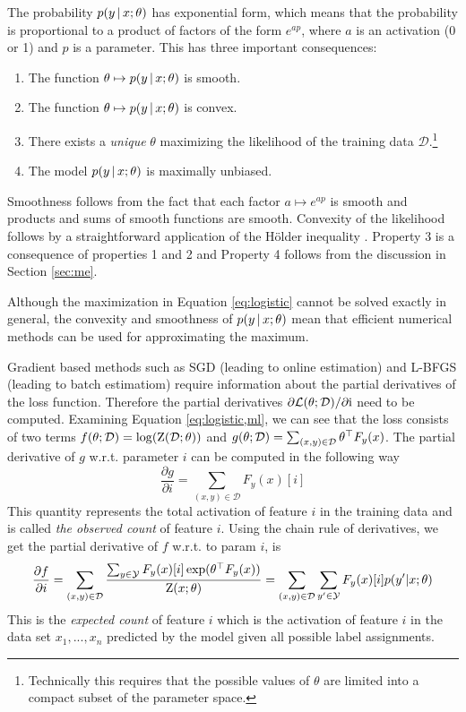 The probability $p(y\mbox{$ \, | \, $} x\mbox{$ ; \, $} \theta)$ has exponential form,
which means that the probability is proportional to a product of
factors of the form $e^{ap}$, where $a$ is an activation (0 or 1) and
$p$ is a parameter. This has three important consequences:

\begin{enumerate}
\item The function $\theta \mapsto p(y\mbox{$ \, | \, $} x\mbox{$ ; \, $} \theta)$ is smooth.
\item The function $\theta \mapsto p(y\mbox{$ \, | \, $} x\mbox{$ ; \, $} \theta)$ is convex.
\item There exists a {\it unique} $\theta$ maximizing the likelihood of the training data $\mathcal{D}$.\footnote{Technically this requires that the possible values of $\theta$ are limited into a compact subset of the parameter space.}
\item The model $p(y\mbox{$ \, | \, $} x\mbox{$ ; \, $} \theta)$ is maximally unbiased. 
\end{enumerate}

Smoothness follows from the fact that each factor $a \mapsto e^{ap}$
is smooth and products and sums of smooth functions are
smooth. Convexity of the likelihood follows by a straightforward application of the Hölder inequality \cite{}. Property 3 is a consequence of properties 1 and 2 and
Property 4 follows from the discussion in Section \ref{sec:me}.

Although the maximization in Equation \ref{eq:logistic} cannot be
solved exactly in general, the convexity and smoothness of
$p(y\mbox{$ \, | \, $} x\mbox{$ ; \, $} \theta)$ mean that efficient numerical methods can
be used for approximating the maximum.

Gradient based methods such as SGD (leading to online estimation) and
L-BFGS (leading to batch estimatiom) require information about the
partial derivatives of the loss function. Therefore the partial
derivatives $\partial\mathcal{L}(\theta\mbox{$ ; \, $}
\mathcal{D})/\partial\mbox{${\rm i}$}$ need to be computed. Examining Equation
\ref{eq:logistic,ml}, we can see that the loss consists of two terms
$f(\theta\mbox{$ ; \, $} \mathcal{D}) = \log(\mbox{${\rm Z}$}(\mathcal{D}\mbox{$ ; \, $} \theta))$
and $g(\theta\mbox{$ ; \, $}\mathcal{D}) = \sum_{(x,y) \in
  \mathcal{D}}\theta^\top F_y(x)$. The partial derivative of $g$
w.r.t. parameter $i$ can be computed in the following way
$$\frac{\partial g}{\partial i} = \sum_{(x,y) \in \mathcal{D}} F_y(x)[i]$$
This quantity represents the total activation of feature $i$ in the training data and is called {\it the observed count} of feature $i$. Using the chain rule of derivatives, we get the partial derivative of $f$ w.r.t. to param $i$, is
$$\frac{\partial f}{\partial i} = \sum_{(x,y) \in \mathcal{D}} \frac{\sum_{y \in \mathcal{Y}}F_y(x)[i] \exp(\theta^\top F_y(x))}{\mbox{${\rm Z}$}(x\mbox{$ ; \, $}\theta)} = \sum_{(x,y) \in \mathcal{D}} \sum_{y' \in \mathcal{Y}}F_y(x)[i] p(y'|x\mbox{$ ; \, $}\theta)$$
This is the {\it expected count} of feature $i$ which is the
activation of feature $i$ in the data set $x_1, ...,x_n$ predicted by
the model given all possible label assignments.

